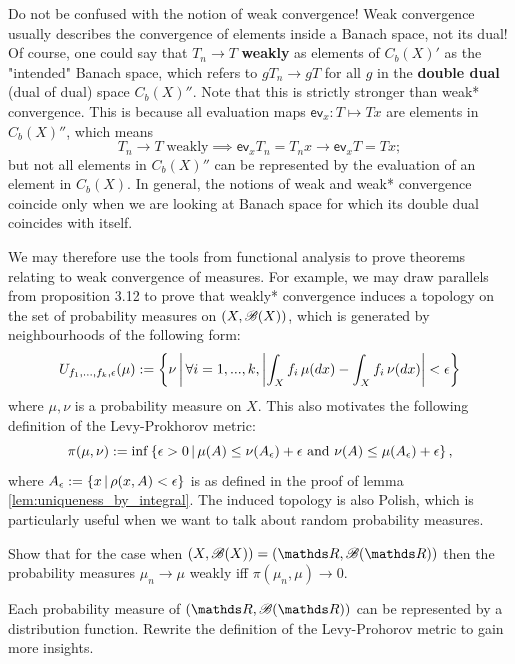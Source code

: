 \begin{unexaminable}
\begin{remark}
Do not be confused with the notion of weak convergence! Weak convergence usually describes the convergence of elements inside a Banach space, not its dual! Of course, one could say that $T_n \to T$ \textbf{weakly} as elements of $C_b(X)'$ as the "intended" Banach space, which refers to $gT_n \to gT$ for all $g$ in the \textbf{double dual} (dual of dual) space $C_b(X)''$. Note that this is strictly stronger than weak* convergence. This is because all evaluation maps $\mathsf{ev}_x: T \mapsto Tx$ are elements in $C_b(X)''$, which means 
\begin{equation*}
    T_n \to T \; \text{weakly} \implies \mathsf{ev}_x T_n = T_n x \to \mathsf{ev}_x T = Tx;
\end{equation*}
but not all elements in $C_b(X)''$ can be represented by the evaluation of an element in $C_b(X)$. In general, the notions of weak and weak* convergence coincide only when we are looking at Banach space for which its double dual coincides with itself.
\end{remark}

We may therefore use the tools from functional analysis to prove theorems relating to weak convergence of measures. For example, we may draw parallels from proposition 3.12 to prove that weakly* convergence induces a topology on the set of probability measures on $(X,\mathcal{B}(X))$, which is generated by neighbourhoods of the following form:
\begin{equation}
    U_{f_1,...,f_k,\epsilon}(\mu) := \left\{ \nu \,\bigg|\, \forall i = 1,...,k, \left| \int_X f_i \, \mu(dx) - \int_X f_i \, \nu(dx) \right| < \epsilon \right \}
\end{equation}
where $\mu, \nu$ is a probability measure on $X$. This also motivates the following definition of the Levy-Prokhorov metric:
\begin{equation}
    \pi(\mu,\nu) := \inf \left\{ \epsilon > 0 \,|\, \mu(A) \leq \nu(A_\epsilon) + \epsilon \text{ and } \nu(A) \leq \mu(A_\epsilon) + \epsilon \right \},
\end{equation}
where $A_\epsilon := \left\{ x \,|\, \rho(x,A) < \epsilon \right \}$ is as defined in the proof of lemma \ref{lem:uniqueness_by_integral}. The induced topology is also Polish, which is particularly useful when we want to talk about random probability measures.

\begin{exercise}
Show that for the case when $(X,\B(X)) = (\R,\B(\R))$ then the probability measures $\mu_n \to \mu$ weakly iff $\pi(\mu_n, \mu) \to 0$.  
\end{exercise}

\begin{hint}
Each probability measure of $(\R,\B(\R))$ can be represented by a distribution function. Rewrite the definition of the Levy-Prohorov metric to gain more insights.
\end{hint}
\end{unexaminable}

